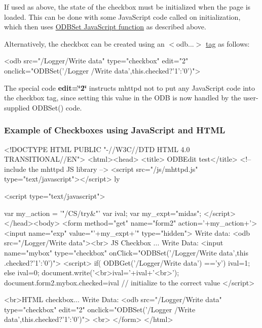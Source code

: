 If used as above, the state of the checkbox must be initialized when the page is loaded. This can be done with some JavaScript code called on initialization, which then uses \hyperlink{RC_mhttpd_custom_ODB_access_RC_mhttpd_custom_odbset}{ODBSet JavaScript function} as described above.

Alternatively, the checkbox can be created using an  $<$odb...$>$  \hyperlink{RC_mhttpd_custom_ODB_access_RC_mhttpd_custom_odb_html}{tag} as follows: 
\begin{DoxyCode}
  <odb src="/Logger/Write data" type="checkbox" edit="2" onclick="ODBSet('/Logger
      /Write data',this.checked?'1':'0')">
\end{DoxyCode}


The special code {\bfseries edit=\char`\"{}2\char`\"{}} instructs mhttpd not to put any JavaScript code into the checkbox tag, since setting this value in the ODB is now handled by the user-\/supplied ODBSet() code.\hypertarget{RC_mhttpd_custom_ODB_access_features_RC_mhttpd_js_example_3}{}\subsubsection{Example of Checkboxes using JavaScript and HTML}\label{RC_mhttpd_custom_ODB_access_features_RC_mhttpd_js_example_3}

\begin{DoxyCode}
<!DOCTYPE HTML PUBLIC "-//W3C//DTD HTML 4.0 TRANSITIONAL//EN">
<html><head>
<title> ODBEdit test</title>
<!-- include the mhttpd JS library -->
\htmlonly <script src="/js/mhttpd.js" type="text/javascript"></script> \endhtmlon
      ly

\htmlonly <script type="text/javascript">

var my_action = '"/CS/try&"'
var ival;
var my_expt="midas";
</script> \endhtmlonly
</head><body>
<form method="get" name="form2" action='+my_action+'>
<input name="exp" value="'+my_expt+'" type="hidden">
Write data: <odb src="/Logger/Write data"><br>
JS Checkbox ... Write Data:
<input  name="mybox"  type="checkbox"   onClick="ODBSet('/Logger/Write data',this
      .checked?'1':'0')">
\htmlonly <script>
if( ODBGet('/Logger/Write data') =='y')
  ival=1;
else
  ival=0;
document.write('<br>ival='+ival+'<br>');
document.form2.mybox.checked=ival  // initialize to the correct value
</script> \endhtmlonly

<br>HTML checkbox... Write Data:
  <odb src="/Logger/Write data" type="checkbox" edit="2" onclick="ODBSet('/Logger
      /Write data',this.checked?'1':'0')">
<br>
</form>
</html>
\end{DoxyCode}


